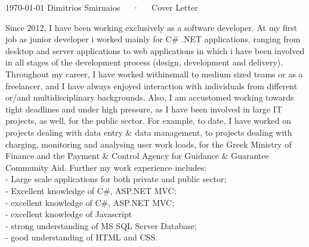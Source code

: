 \documentclass[11pt, a4paper]{awesome-cv}
\begin{document}
\makecvheader[R]

\makecvfooter
  {\today}
  {Dimitrios Smirnaios~~~·~~~Cover Letter}
  {}

\makelettertitle

\begin{cvletter}

Since 2012, I have been working exclusively as a software developer. At my first job as junior developer i worked mainly for C\# .NET
applications, ranging from desktop and server applications to web applications in which
i have been involved in all stages of the development process (design, development and
delivery). Throughout my career, I have worked withinsmall to medium sized teams or as a freelancer, and I have always enjoyed interaction with
individuals from different or/and multidisciplinary backgrounds. Also, I am accustomed working towards
tight deadlines and under high pressure, as I have been involved in large IT projects, as well,
for the public sector. For example, to date, I have worked on projects dealing with data entry
\& data management, to projects dealing with charging, monitoring and analysing user work
loads, for the Greek Ministry of Finance and the Payment \& Control Agency for Guidance \&
Guarantee Community Aid.
Further my work experience includes:\\
- Large scale applications for both private and public sector;\\
- Excellent knowledge of C\#, ASP.NET MVC;\\
- excellent knowledge of C\#, ASP.NET MVC;\\
- excellent knowledge of Javascript\\
- strong understanding of MS SQL Server Database;\\
- good understanding of HTML and CSS.


\end{cvletter}
\end{document}
